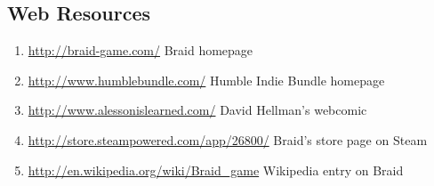 \documentclass[a4paper,12pt]{report}
\begin{document}
\subsection*{Web Resources}

\begin{enumerate}
\item \label{braidlink}\url{http://braid-game.com/} Braid homepage
\item \label{hiblink}\url{http://www.humblebundle.com/} Humble Indie Bundle homepage
\item \label{artlink}\url{http://www.alessonislearned.com/} David Hellman's webcomic 
\item \label{steamlink} \url{http://store.steampowered.com/app/26800/} Braid's store page on Steam
\item \url{http://en.wikipedia.org/wiki/Braid_game} Wikipedia entry on Braid
\end{enumerate}
\end{document}
